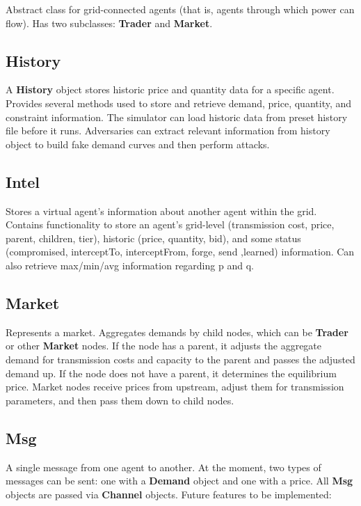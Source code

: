 \documentclass[12pt]{article}
\begin{document}
Abstract class for grid-connected agents (that is, agents through
which power can flow).  Has two subclasses: \textbf{Trader} and \textbf{Market}.

\subsection{History} \mbox{}

A \textbf{History} object stores historic price and quantity data for a specific 
agent. Provides several methods used to store and retrieve demand, 
price, quantity, and constraint information. The simulator can load historic 
data from preset history file before it runs. Adversaries can extract 
relevant information from history object to build fake demand curves 
and then perform attacks.

\subsection{Intel} \mbox{}

Stores a virtual agent's information about another agent within the grid. 
Contains functionality to store an agent's 
grid-level (transmission cost, price, parent, children, tier), 
historic (price, quantity, bid), and some status (compromised, interceptTo, 
interceptFrom, forge, send ,learned) information. Can also 
retrieve max/min/avg information regarding p and q.

\subsection{Market} \mbox{}

Represents a market.  Aggregates demands by child nodes, which can be 
\textbf{Trader} or other \textbf{Market} nodes. If the node has a parent, it adjusts 
the aggregate demand for transmission costs and capacity to the parent
and passes the adjusted demand up.  If the node does not have a parent, 
it determines the equilibrium price.  Market nodes receive prices from 
upstream, adjust them for transmission parameters, and then pass them 
down to child nodes.

\subsection{Msg} \mbox{}

A single message from one agent to another.  At the moment, two types of 
messages can be sent: one with a \textbf{Demand} object and one with a 
price.  All \textbf{Msg} objects are passed via \textbf{Channel} objects. Future 
features to be implemented:
\end{document}
